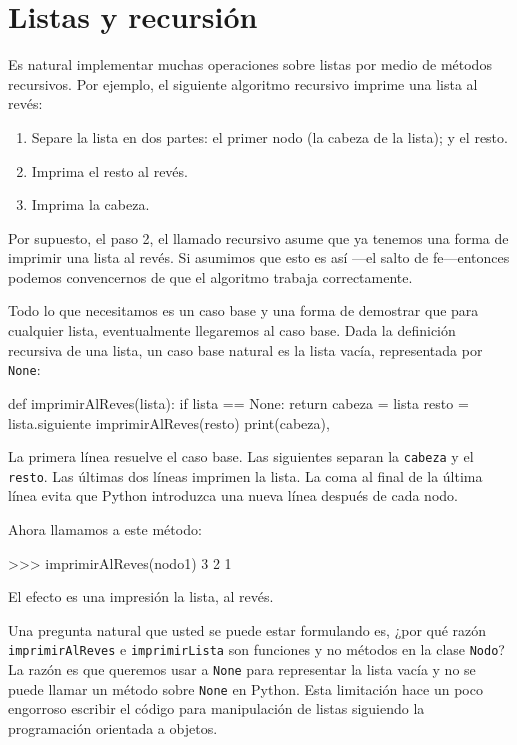 \section{Listas y recursión}

\label{listrecursion}  

Es natural implementar muchas operaciones sobre listas por medio de
métodos recursivos. Por ejemplo, el siguiente algoritmo recursivo
imprime una lista al revés:
\begin{enumerate}
\item Separe la lista en dos partes: el primer nodo (la cabeza de la lista);
y el resto.
\item Imprima el resto al revés.
\item Imprima la cabeza.
\end{enumerate}
Por supuesto, el paso 2, el llamado recursivo asume que ya tenemos
una forma de imprimir una lista al revés. Si asumimos que esto es
así —el salto de fe—entonces podemos convencernos de que el algoritmo
trabaja correctamente.

 

Todo lo que necesitamos es un caso base y una forma de demostrar que
para cualquier lista, eventualmente llegaremos al caso base. Dada
la definición recursiva de una lista, un caso base natural es la lista
vacía, representada por \texttt{None}:

\beforeverb 
\begin{pythoncode}
def imprimirAlReves(lista):
  if lista == None: 
    return
  cabeza = lista
  resto = lista.siguiente
  imprimirAlReves(resto)
  print(cabeza),
\end{pythoncode}
\afterverb La primera línea resuelve el caso base. Las siguientes
separan la \texttt{cabeza} y el \texttt{resto}. Las últimas dos líneas
imprimen la lista. La coma al final de la última línea evita que Python
introduzca una nueva línea después de cada nodo.

Ahora llamamos a este método:

\beforeverb 
\begin{pyconcode}
>>> imprimirAlReves(nodo1)
3 2 1
\end{pyconcode}
\afterverb El efecto es una impresión la lista, al revés.

Una pregunta natural que usted se puede estar formulando es, ¿por
qué razón \texttt{imprimirAlReves} e \texttt{imprimirLista} son funciones
y no métodos en la clase \texttt{Nodo}? La razón es que queremos usar
a \texttt{None} para representar la lista vacía y no se puede llamar
un método sobre \texttt{None} en Python. Esta limitación hace un poco
engorroso escribir el código para manipulación de listas siguiendo
la programación orientada a objetos.

